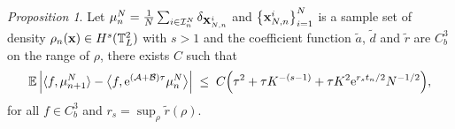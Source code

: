 \documentclass[preprint,12pt]{elsarticle}
\theoremstyle{definition}
\theoremstyle{remark}
\newtheorem{proposition}{Proposition}
\begin{document}
\begin{proposition}
Let $\mu^N_n= \frac{1}{N}\sum_{i\in \mathcal I^N_n}\delta_{\mathbf{X}_{N,n}^i}$ and $\left\{\mathbf{x}_{N,n}^i\right\}_{i=1}^{N}$ is a sample set of density $\rho_n(\mathbf x) \in H^s(\mathbb{T}_L^2)$ with $s>1$ and the coefficient function $\tilde{a}$, $\tilde{d}$ and $\tilde{r}$ are $C^3_b$ on the range of $\rho$, there exists $C$ such that
\begin{equation}
\mathbb{E}\left\vert \langle f,\mu_{n+1}^N\rangle
- \big\langle f, {\rm e}^{(\mathcal{A} + \mathcal{B})\tau} \mu_n^N\big\rangle\right\vert
\;\le\; C \Big(\tau^2 + \tau K^{-(s-1)} + \tau K^2 {\rm e}^{r_s t_n/2} N^{-1/2}\Big),
\label{eq:one_step_err}
\end{equation}
for all $f\in C^3_b$ and $r_s = \sup_{\rho} \tilde{r}(\rho)$. 
\end{proposition}
\end{document}
